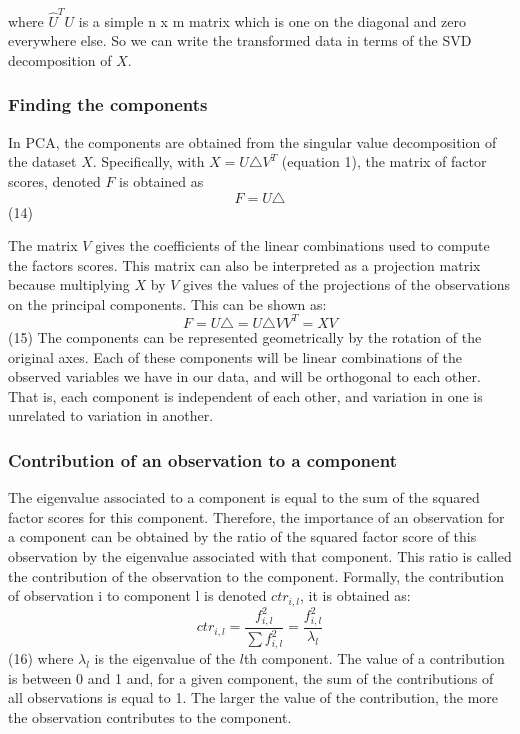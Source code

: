 \documentclass[12pt,twoside]{article}
\begin{document}
where $\hat{U}^{T}U$ is a simple n x m matrix which is one on the diagonal and zero everywhere else. So we can write the transformed data in terms of the SVD decomposition of $X$. 


\subsubsection*{Finding the components}

In PCA, the components are obtained from the singular value decomposition of the dataset $X$. Specifically, with $X = U\triangle V^{T}$ (equation 1), the matrix of factor scores, denoted $F$ is obtained as
$$ F = U\triangle$$ \hfill (14)

The matrix $V$ gives the coefficients of the linear combinations used to compute the factors scores. This matrix can also be interpreted as a projection matrix because multiplying $X$ by $V$ gives the values of the projections of the observations on the principal components. This can be shown as:
$$ F = U\triangle = U\triangle VV^{T}  = XV$$ \hfill (15) 
\bigbreak
The components can be represented geometrically by the rotation of the original axes. Each of these components will be linear combinations of the observed variables we have in our data, and will be orthogonal to each other. That is, each component is independent of each other, and variation in one is unrelated to variation in another. 

\subsubsection*{Contribution of an observation to a component}

The eigenvalue associated to a component is equal to the sum of the squared factor scores for this component. Therefore, the importance of an observation for a component can be obtained by the ratio of the squared factor score of this observation by the eigenvalue associated with that component. This ratio is called the contribution of the observation to the component. Formally, the contribution of observation i to component l is denoted $ ctr_{i,l}$, it is obtained as:
$$ ctr_{i,l} = \frac{f^2_{i,l} }{\sum f^2_{i,l}} = \frac{f^2_{i,l} }{\lambda_{l}} $$  \hfill (16)
where $\lambda_{l}$ is the eigenvalue of the $l$th component. The value of a contribution is between 0 and 1 and, for a given component, the sum of the contributions of all observations is equal to 1. The larger the value of the contribution, the more the observation contributes to the component. 
\end{document}
